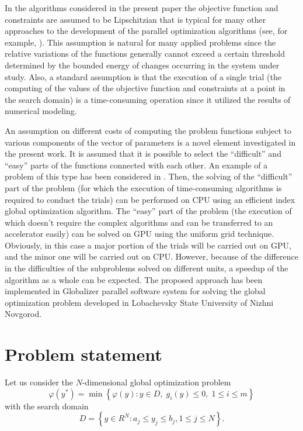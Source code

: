 \documentclass[a4paper]{jpconf}
\begin{document}
In the algorithms considered in the present paper the objective function and constraints are assumed to be Lipschitzian that is typical for many other approaches to the development of the parallel optimization algorithms (see, for example, \cite{Jones,Zilinskas,Evtushenko2009,Evtushenko2014}). This assumption is natural for many applied problems since the relative variations of the functions generally cannot exceed a certain threshold determined by the bounded energy of changes occurring in the system under study. Also, a standard assumption is that the execution of a single trial (the computing of the values of the objective function and constraints at a point in the search domain) is a time-consuming operation since it utilized the results of numerical modeling. 

An assumption on different costs of computing the problem functions subject to 
various components of the vector of parameters is a novel element investigated in the present work. 
It is assumed that it is possible to select the ``difficult'' and ``easy'' parts 
of the functions connected with each other. An example of a problem of this type has been considered in \cite{Strongin2017}.
Then, the solving of the ``difficult'' part of the problem (for which the execution of time-consuming algorithms is required to conduct the trials) can be performed on CPU using an efficient index global optimization algorithm. The ``easy'' part of the problem (the execution of which doesn't require the complex algorithms 
and can be transferred to an accelerator easily) can be solved on GPU using 
the uniform grid technique. Obviously, in this case a major portion of the trials 
will be carried out on GPU, and the minor one will be carried out on CPU. However, 
because of the difference in the difficulties of the subproblems solved on 
different units, a speedup of the algorithm as a whole can be expected. 
The proposed approach has been implemented in Globalizer parallel software 
system for solving the global optimization problem developed in Lobachevsky 
State University of Nizhni Novgorod. 

\section{Problem statement}

Let us consider the $N$-dimensional global optimization problem
\begin{equation}\label{problem}
\varphi(y^\ast)=\min{\left\{\varphi(y): y \in D, \; g_i(y)\leq 0, \; 1 \leq i 
\leq m\right\}}
\end{equation}
with the search domain
\[
D=\left\{y\in R^N: a_j\leq y_j \leq b_j, 1\leq j \leq N \right\}.
\]
\end{document}
